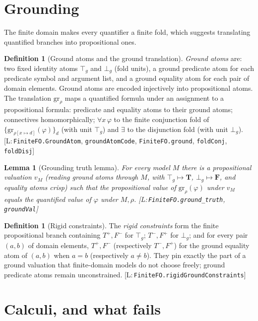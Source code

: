 \documentclass[11pt,a4paper]{article}
\newtheorem{lemma}[theorem]{Lemma}
\theoremstyle{definition}
\newtheorem{definition}[theorem]{Definition}
\newcommand{\vT}{\mathbf{T}}
\newcommand{\vF}{\mathbf{F}}
\newcommand{\Tp}{T^{+}}\newcommand{\Tm}{T^{-}}
\newcommand{\Fp}{F^{+}}\newcommand{\Fm}{F^{-}}
\newcommand{\lean}[1]{\texttt{#1}}
\newcommand{\grd}{\mathrm{gr}}
\begin{document}
\section{Grounding}\label{sec:groundtrans}

The finite domain makes every quantifier a finite fold, which suggests
translating quantified branches into propositional ones.

\begin{definition}[Ground atoms and the ground translation]\label{def:ground}
\emph{Ground atoms} are: two fixed identity atoms $\top_g$ and $\bot_g$
(fold units), a ground predicate atom for each predicate symbol and
argument list, and a ground equality atom for each pair of domain
elements. Ground atoms are encoded injectively into propositional atoms.
The translation $\grd_\rho$ maps a quantified formula under an assignment
to a propositional formula: predicate and equality atoms to their ground
atoms; connectives homomorphically; $\forall x\,\varphi$ to the finite
conjunction fold of $\{\grd_{\rho[x\mapsto d]}(\varphi)\}_d$ (with unit
$\top_g$) and $\exists$ to the disjunction fold (with unit $\bot_g$).
[L:\,\lean{FiniteFO.GroundAtom}, \lean{groundAtomCode},
\lean{FiniteFO.ground}, \lean{foldConj}, \lean{foldDisj}]
\end{definition}

\begin{lemma}[Grounding truth lemma]\label{lem:groundtruth}
For every model $M$ there is a propositional valuation $v_M$ (reading
ground atoms through $M$, with $\top_g\mapsto\vT$, $\bot_g\mapsto\vF$, and
equality atoms crisp) such that the propositional value of
$\grd_\rho(\varphi)$ under $v_M$ equals the quantified value of $\varphi$
under $M,\rho$. [L:\,\lean{FiniteFO.ground\_truth},
\lean{groundVal}]
\end{lemma}

\begin{definition}[Rigid constraints]\label{def:rigid}
The \emph{rigid constraints} form the finite propositional branch
containing $\Tp,\Fm$ for $\top_g$; $\Tm,\Fp$ for $\bot_g$; and for every
pair $(a,b)$ of domain elements, $\Tp,\Fm$ (respectively $\Tm,\Fp$) for
the ground equality atom of $(a,b)$ when $a=b$ (respectively $a\neq b$).
They pin exactly the part of a ground valuation that finite-domain models
do not choose freely; ground predicate atoms remain unconstrained.
[L:\,\lean{FiniteFO.rigidGroundConstraints}]
\end{definition}

\section{Calculi, and what fails}\label{sec:negative}
\end{document}

